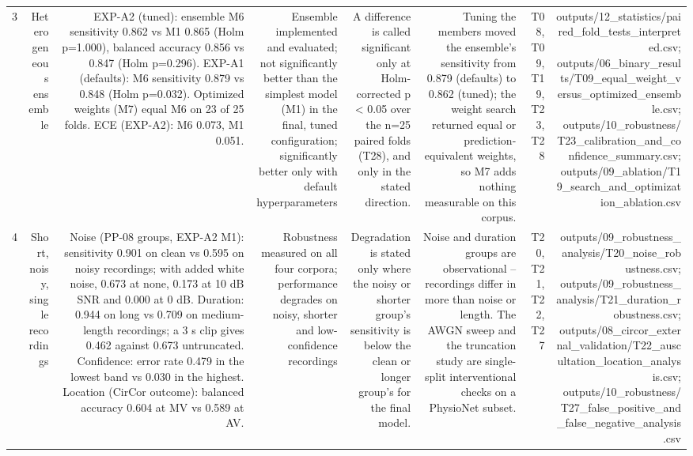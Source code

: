 \begin{table}[htbp]
\begin{tabular}{lrrrrrrr}
    3 & Heterogeneous ensemble & EXP-A2 (tuned): ensemble M6 sensitivity 0.862 vs M1 0.865 (Holm p=1.000), balanced accuracy 0.856 vs 0.847 (Holm p=0.296). EXP-A1 (defaults): M6 sensitivity 0.879 vs 0.848 (Holm p=0.032). Optimized weights (M7) equal M6 on 23 of 25 folds. ECE (EXP-A2): M6 0.073, M1 0.051. & Ensemble implemented and evaluated; not significantly better than the simplest model (M1) in the final, tuned configuration; significantly better only with default hyperparameters & A difference is called significant only at Holm-corrected p < 0.05 over the n=25 paired folds (T28), and only in the stated direction. & Tuning the members moved the ensemble's sensitivity from 0.879 (defaults) to 0.862 (tuned); the weight search returned equal or prediction-equivalent weights, so M7 adds nothing measurable on this corpus. & T08, T09, T19, T23, T28 & outputs/12\_statistics/paired\_fold\_tests\_interpreted.csv; outputs/06\_binary\_results/T09\_equal\_weight\_versus\_optimized\_ensemble.csv; outputs/10\_robustness/T23\_calibration\_and\_confidence\_summary.csv; outputs/09\_ablation/T19\_search\_and\_optimization\_ablation.csv \\
    4 & Short, noisy, single recordings & Noise (PP-08 groups, EXP-A2 M1): sensitivity 0.901 on clean vs 0.595 on noisy recordings; with added white noise, 0.673 at none, 0.173 at 10 dB SNR and 0.000 at 0 dB. Duration: 0.944 on long vs 0.709 on medium-length recordings; a 3 s clip gives 0.462 against 0.673 untruncated. Confidence: error rate 0.479 in the lowest band vs 0.030 in the highest. Location (CirCor outcome): balanced accuracy 0.604 at MV vs 0.589 at AV. & Robustness measured on all four corpora; performance degrades on noisy, shorter and low-confidence recordings & Degradation is stated only where the noisy or shorter group's sensitivity is below the clean or longer group's for the final model. & Noise and duration groups are observational -- recordings differ in more than noise or length. The AWGN sweep and the truncation study are single-split interventional checks on a PhysioNet subset. & T20, T21, T22, T27 & outputs/09\_robustness\_analysis/T20\_noise\_robustness.csv; outputs/09\_robustness\_analysis/T21\_duration\_robustness.csv; outputs/08\_circor\_external\_validation/T22\_auscultation\_location\_analysis.csv; outputs/10\_robustness/T27\_false\_positive\_and\_false\_negative\_analysis.csv \\

\end{tabular}
\end{table}
